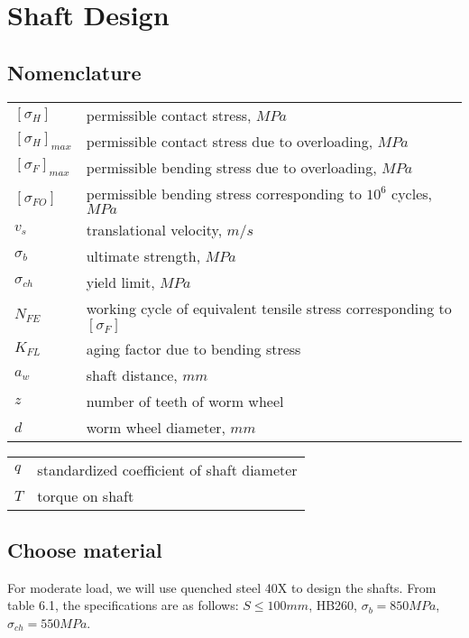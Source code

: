 \chapter{Shaft Design}
\section{Nomenclature}
\begin{tabular}[t]{lp{7cm}}
	$ [\sigma_H] $ & permissible contact stress, $ MPa $\\
	$ [\sigma_H]_{max} $ & permissible contact stress due to overloading, $ MPa $\\
	$ [\sigma_F]_{max} $ & permissible bending stress due to overloading, $ MPa $\\
	$ [\sigma_{FO}] $ & permissible bending stress corresponding to $ 10^6 $ cycles, $ MPa $\\
	$ v_s $ & translational velocity, $ m/s $\\
	$ \sigma_b $ & ultimate strength, $ MPa $\\
	$ \sigma_{ch} $ & yield limit, $ MPa $\\
	$ N_{FE} $ & working cycle of equivalent tensile stress corresponding to $ [\sigma_F] $\\
	$ K_{FL} $ & aging factor due to bending stress\\
	$ a_w $ & shaft distance, $ mm $\\
	$ z $ & number of teeth of worm wheel\\
	$ d $ & worm wheel diameter, $ mm $\\
	
\end{tabular}
\begin{tabular}[t]{lp{7cm}}
	$ q $ & standardized coefficient of shaft diameter\\
	$ T $ & torque on shaft
\end{tabular}
\section{Choose material}
For moderate load, we will use quenched steel 40X to design the shafts. From table 6.1, the specifications are as follows: $ S \leq 100\unit{mm} $, HB260, $ \sigma_b = 850\unit{MPa}$, $ \sigma_{ch} = 550\unit{MPa}$. 


